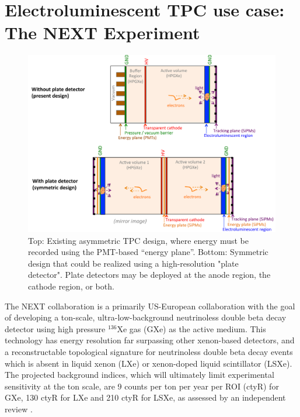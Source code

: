 \section{Electroluminescent TPC use case: The NEXT Experiment}
\begin{figure}[t]
\begin{centering}
\includegraphics[width=0.85\columnwidth]{./images/PlateDetectorNEXT.pdf}
\par\end{centering}

\caption{Top: Existing asymmetric TPC design, where energy must be recorded using the PMT-based ``energy plane''.  Bottom: Symmetric design that could be realized using a high-resolution "plate detector".  Plate detectors may be deployed at the anode region, the cathode region, or both. \label{fig:PlateDetectorNEXT}}
\end{figure}


The NEXT collaboration is a primarily US-European collaboration with the goal of developing a ton-scale, ultra-low-background neutrinoless double beta decay detector using high pressure $^{136}$Xe gas (GXe) as the active medium.  This technology has energy resolution far surpassing other xenon-based detectors, and a reconstructable topological signature for neutrinoless double beta decay events which is absent in liquid xenon (LXe) or xenon-doped liquid scintillator (LSXe).  The projected background indices, which will ultimately limit experimental sensitivity at the ton scale, are 9 counts per ton per year per ROI (ctyR) for GXe, 130 ctyR for LXe and 210 ctyR for LSXe, as assessed by an independent review \cite{LRP}.

